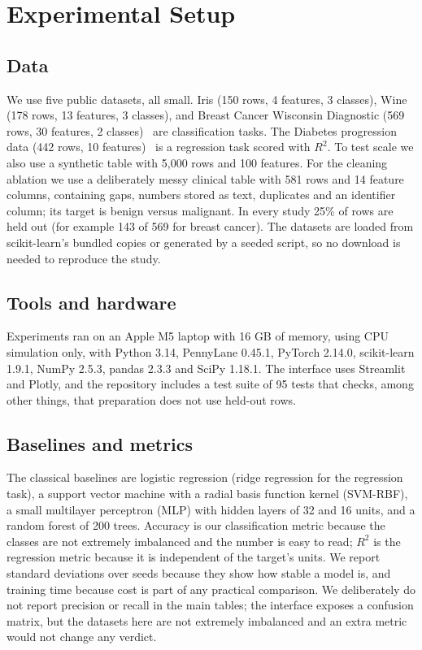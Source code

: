 \documentclass[12pt,onecolumn,draftclsnofoot]{IEEEtran}
\begin{document}
\section{Experimental Setup}
\subsection{Data}
We use five public datasets, all small. Iris (150 rows, 4 features, 3 classes), Wine (178 rows, 13 features, 3 classes), and Breast Cancer Wisconsin Diagnostic (569 rows, 30 features, 2 classes)~\cite{wolberg1993wdbc} are classification tasks. The Diabetes progression data (442 rows, 10 features)~\cite{efron2004lars} is a regression task scored with $R^2$. To test scale we also use a synthetic table with 5,000 rows and 100 features. For the cleaning ablation we use a deliberately messy clinical table with 581 rows and 14 feature columns, containing gaps, numbers stored as text, duplicates and an identifier column; its target is benign versus malignant. In every study 25\% of rows are held out (for example 143 of 569 for breast cancer). The datasets are loaded from scikit-learn's bundled copies or generated by a seeded script, so no download is needed to reproduce the study.

\subsection{Tools and hardware}
Experiments ran on an Apple M5 laptop with 16 GB of memory, using CPU simulation only, with Python 3.14, PennyLane 0.45.1, PyTorch 2.14.0, scikit-learn 1.9.1, NumPy 2.5.3, pandas 2.3.3 and SciPy 1.18.1. The interface uses Streamlit and Plotly, and the repository includes a test suite of 95 tests that checks, among other things, that preparation does not use held-out rows.

\subsection{Baselines and metrics}
The classical baselines are logistic regression (ridge regression for the regression task), a support vector machine with a radial basis function kernel (SVM-RBF), a small multilayer perceptron (MLP) with hidden layers of 32 and 16 units, and a random forest of 200 trees. Accuracy is our classification metric because the classes are not extremely imbalanced and the number is easy to read; $R^2$ is the regression metric because it is independent of the target's units. We report standard deviations over seeds because they show how stable a model is, and training time because cost is part of any practical comparison. We deliberately do not report precision or recall in the main tables; the interface exposes a confusion matrix, but the datasets here are not extremely imbalanced and an extra metric would not change any verdict.
\end{document}
